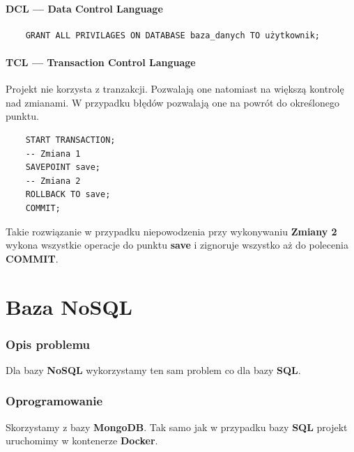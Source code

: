 \documentclass[a4paper,11pt]{article}
\begin{document}
\subsection*{DCL --- Data Control Language}
\begin{verbatim}
    GRANT ALL PRIVILAGES ON DATABASE baza_danych TO użytkownik;
\end{verbatim}

\subsection*{TCL --- Transaction Control Language}
Projekt nie korzysta z tranzakcji. Pozwalają one natomiast na większą kontrolę nad zmianami.
W przypadku błędów pozwalają one na powrót do określonego punktu.
\begin{verbatim}
    START TRANSACTION;
    -- Zmiana 1
    SAVEPOINT save;
    -- Zmiana 2
    ROLLBACK TO save;
    COMMIT;
\end{verbatim}
Takie rozwiązanie w przypadku niepowodzenia przy wykonywaniu \textbf{Zmiany 2}
wykona wszystkie operacje do punktu \textbf{save} i zignoruje wszystko aż do polecenia \textbf{COMMIT}.

\pagebreak
\part{Baza NoSQL}
\section*{Opis problemu}
Dla bazy \textbf{NoSQL} wykorzystamy ten sam problem co dla bazy \textbf{SQL}.

\section*{Oprogramowanie}
Skorzystamy z bazy \textbf{MongoDB}. Tak samo jak w przypadku bazy \textbf{SQL} projekt uruchomimy w kontenerze \textbf{Docker}.
\end{document}
